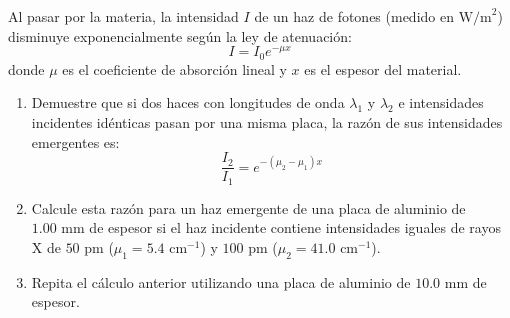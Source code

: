 \item Al pasar por la materia, la intensidad $I$ de un haz de fotones (medido en $\text{W/m}^2$) disminuye exponencialmente según la ley de atenuación:
$$ I = I_0 e^{-\mu x} $$
donde $\mu$ es el coeficiente de absorción lineal y $x$ es el espesor del material.
\begin{enumerate}
    \item Demuestre que si dos haces con longitudes de onda $\lambda_1$ y $\lambda_2$ e intensidades incidentes idénticas pasan por una misma placa, la razón de sus intensidades emergentes es:
    $$ \frac{I_2}{I_1} = e^{-(\mu_2 - \mu_1)x} $$
    \item Calcule esta razón para un haz emergente de una placa de aluminio de $1.00\text{ mm}$ de espesor si el haz incidente contiene intensidades iguales de rayos X de $50\text{ pm}$ ($\mu_1 = 5.4\text{ cm}^{-1}$) y $100\text{ pm}$ ($\mu_2 = 41.0\text{ cm}^{-1}$).
    \item Repita el cálculo anterior utilizando una placa de aluminio de $10.0\text{ mm}$ de espesor.
\end{enumerate}